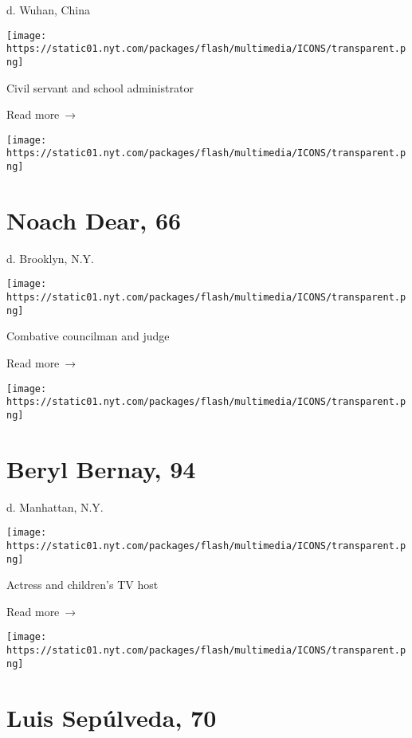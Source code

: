 d. Wuhan, China

\texttt{[image: https://static01.nyt.com/packages/flash/multimedia/ICONS/transparent.png]}

Civil servant and school administrator

 Read more~→

\href{https://www.nytimes.com/2020/04/20/obituaries/noach-dear-dead-coronavirus.html}{}

\texttt{[image: https://static01.nyt.com/packages/flash/multimedia/ICONS/transparent.png]}

\hypertarget{noach-dear-66}{%
\section{Noach Dear, 66}\label{noach-dear-66}}

d. Brooklyn, N.Y.

\texttt{[image: https://static01.nyt.com/packages/flash/multimedia/ICONS/transparent.png]}

Combative councilman and judge

 Read more~→

\href{https://www.nytimes.com/2020/04/20/obituaries/beryl-bernay-dead-coronavirus.html}{}

\texttt{[image: https://static01.nyt.com/packages/flash/multimedia/ICONS/transparent.png]}

\hypertarget{beryl-bernay-94}{%
\section{Beryl Bernay, 94}\label{beryl-bernay-94}}

d. Manhattan, N.Y.

\texttt{[image: https://static01.nyt.com/packages/flash/multimedia/ICONS/transparent.png]}

Actress and children's TV host

 Read more~→

\href{https://www.nytimes.com/2020/04/20/obituaries/luis-sepulveda-dead-coronavirus.html}{}

\texttt{[image: https://static01.nyt.com/packages/flash/multimedia/ICONS/transparent.png]}

\hypertarget{luis-sepuxfalveda-70}{%
\section{Luis Sepúlveda, 70}\label{luis-sepuxfalveda-70}}

